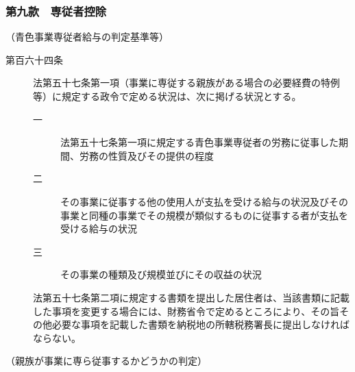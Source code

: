 \documentclass[twocolumn,a4j,10pt]{ltjtarticle}
\begin{document}
\subsubsection*{第九款　専従者控除}
\noindent\hspace{10pt}（青色事業専従者給与の判定基準等）
\begin{description}
\item[第百六十四条]法第五十七条第一項（事業に専従する親族がある場合の必要経費の特例等）に規定する政令で定める状況は、次に掲げる状況とする。
\begin{description}
\item[一]法第五十七条第一項に規定する青色事業専従者の労務に従事した期間、労務の性質及びその提供の程度
\item[二]その事業に従事する他の使用人が支払を受ける給与の状況及びその事業と同種の事業でその規模が類似するものに従事する者が支払を受ける給与の状況
\item[三]その事業の種類及び規模並びにその収益の状況
\end{description}
\item[]法第五十七条第二項に規定する書類を提出した居住者は、当該書類に記載した事項を変更する場合には、財務省令で定めるところにより、その旨その他必要な事項を記載した書類を納税地の所轄税務署長に提出しなければならない。
\end{description}
\noindent\hspace{10pt}（親族が事業に専ら従事するかどうかの判定）
\end{document}

